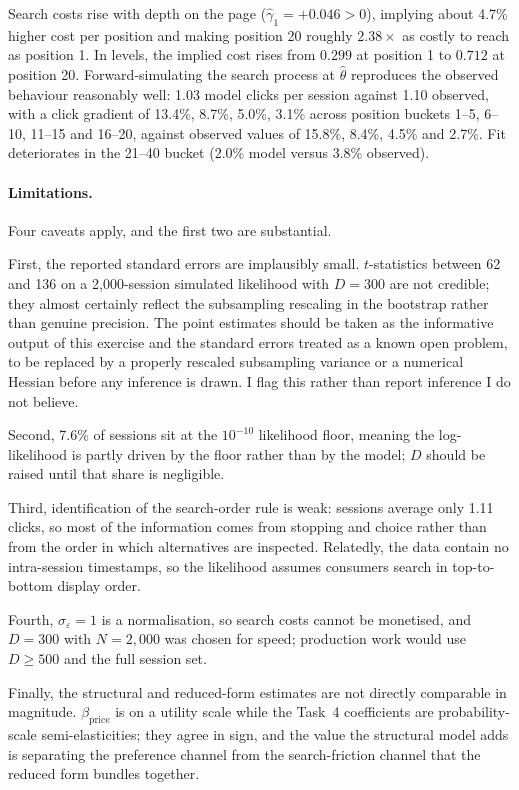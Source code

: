 \documentclass[11pt]{article}
\begin{document}
Search costs rise with depth on the page ($\hat\gamma_1 = +0.046 > 0$),
implying about 4.7\% higher cost per position and making position 20 roughly
$2.38\times$ as costly to reach as position 1. In levels, the implied cost
rises from $0.299$ at position 1 to $0.712$ at position 20. Forward-simulating
the search process at $\hat\theta$ reproduces the observed behaviour reasonably
well: 1.03 model clicks per session against 1.10 observed, with a click
gradient of 13.4\%, 8.7\%, 5.0\%, 3.1\% across position buckets 1--5, 6--10,
11--15 and 16--20, against observed values of 15.8\%, 8.4\%, 4.5\% and 2.7\%.
Fit deteriorates in the 21--40 bucket (2.0\% model versus 3.8\% observed).

\paragraph{Limitations.} Four caveats apply, and the first two are substantial.

First, the reported standard errors are implausibly small. $t$-statistics
between 62 and 136 on a 2,000-session simulated likelihood with $D = 300$ are
not credible; they almost certainly reflect the subsampling rescaling in the
bootstrap rather than genuine precision. The point estimates should be taken as
the informative output of this exercise and the standard errors treated as a
known open problem, to be replaced by a properly rescaled subsampling variance
or a numerical Hessian before any inference is drawn. I flag this rather than
report inference I do not believe.

Second, 7.6\% of sessions sit at the $10^{-10}$ likelihood floor, meaning the
log-likelihood is partly driven by the floor rather than by the model; $D$
should be raised until that share is negligible.

Third, identification of the search-order rule is weak: sessions average only
1.11 clicks, so most of the information comes from stopping and choice rather
than from the order in which alternatives are inspected. Relatedly, the data
contain no intra-session timestamps, so the likelihood assumes consumers search
in top-to-bottom display order.

Fourth, $\sigma_\varepsilon = 1$ is a normalisation, so search costs cannot be
monetised, and $D = 300$ with $N = 2{,}000$ was chosen for speed; production
work would use $D \geq 500$ and the full session set.

Finally, the structural and reduced-form estimates are not directly comparable
in magnitude. $\beta_{\text{price}}$ is on a utility scale while the Task~4
coefficients are probability-scale semi-elasticities; they agree in sign, and
the value the structural model adds is separating the preference channel from
the search-friction channel that the reduced form bundles together.
\end{document}
